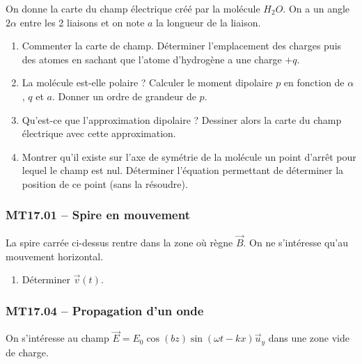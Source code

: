 On donne la carte du champ électrique créé par la molécule $H_2O$. On a un angle $2\alpha$ entre les 2 liaisons et on note $a$ la longueur de la liaison.

\begin{center}
\end{center}

\begin{enumerate}
    \item Commenter la carte de champ. Déterminer l'emplacement des charges puis des atomes en sachant que l'atome d'hydrogène a une charge $+q$.
    \item La molécule est-elle polaire ? Calculer le moment dipolaire $p$ en fonction de $\alpha$, $q$ et $a$. Donner un ordre de grandeur de $p$.
    \item Qu'est-ce que l'approximation dipolaire ? Dessiner alors la carte du champ électrique avec cette approximation.
    \item Montrer qu'il existe sur l'axe de symétrie de la molécule un point d'arrêt pour lequel le champ est nul. Déterminer l'équation permettant de déterminer la position de ce point (sans la résoudre).
\end{enumerate}

\newpage
\subsubsection*{MT17.01 -- Spire en mouvement  \corrige}

\begin{center}
\end{center}

La spire carrée ci-dessus rentre dans la zone où règne $\overrightarrow{B}$. On ne s'intéresse qu'au mouvement horizontal.

\begin{enumerate}
    \item Déterminer $\overrightarrow{v}(t)$.
\end{enumerate}

\subsubsection*{MT17.04 -- Propagation d'un onde  \corrige}

On s'intéresse au champ $\overrightarrow{E} = E_0 \cos(bz) \sin(\omega t - kx) \overrightarrow{u}_y$ dans une zone vide de charge.

